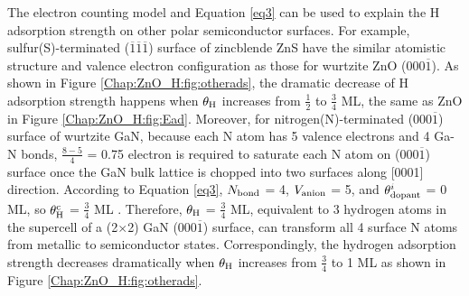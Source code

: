 The electron counting model and Equation \ref{eq3} can be used to explain the H adsorption strength on other polar semiconductor surfaces. For example, sulfur(S)-terminated ($\overline{1}$$\overline{1}$$\overline{1}$) surface of zincblende ZnS have the similar atomistic structure and valence electron configuration as those for wurtzite ZnO (000$\overline{1}$). As shown in Figure \ref{Chap:ZnO_H:fig:otherads}, the dramatic decrease of H adsorption strength happens when $\theta_{\textup{H}}$ increases from $\frac{1}{2}$ to $\frac{3}{4}$ ML, the same as ZnO in Figure \ref{Chap:ZnO_H:fig:Ead}. Moreover, for nitrogen(N)-terminated (000$\overline{1}$) surface of wurtzite GaN, because each N atom has 5 valence electrons and 4 Ga-N bonds, $\frac{8-5}{4}$ = 0.75 electron is required to saturate each N atom on (000$\overline{1}$) surface once the GaN bulk lattice is chopped into two surfaces along [0001] direction. According to Equation \ref{eq3}, $N_{\textup{bond}}$ = 4, $V_{\textup{anion}}$ = 5, and $\theta_{\textup{dopant}}^i$ = 0 ML, so $\theta_{\textup{H}}^{\textup{c}}$ = $\frac{3}{4}$ ML . Therefore, $\theta_{\textup{H}}$ = $\frac{3}{4}$ ML, equivalent to 3 hydrogen atoms in the supercell of a (2$\times$2) GaN (000$\overline{1}$) surface, can transform all 4 surface N atoms from metallic to semiconductor states. Correspondingly, the hydrogen adsorption strength decreases dramatically when $\theta_{\textup{H}}$ increases from $\frac{3}{4}$ to 1 ML as shown in Figure \ref{Chap:ZnO_H:fig:otherads}. 